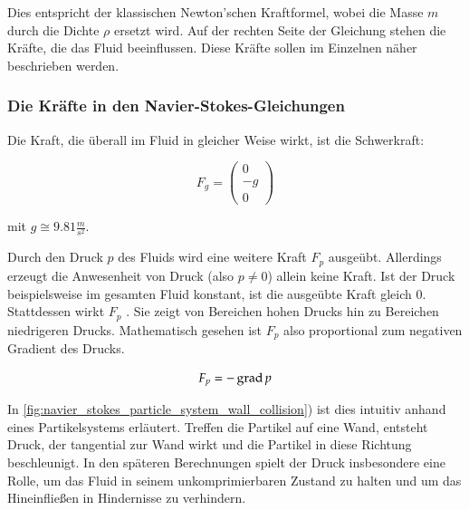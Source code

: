 Dies entspricht der klassischen Newton'schen Kraftformel, wobei die
Masse $m$ durch die Dichte $\rho$ ersetzt wird. Auf der rechten Seite
der Gleichung stehen die Kräfte, die das Fluid beeinflussen. Diese
Kräfte sollen im Einzelnen näher beschrieben werden.

\subsubsection{Die Kräfte in den Navier-Stokes-Gleichungen}

Die Kraft, die überall im Fluid in gleicher Weise wirkt, ist die Schwerkraft:

\begin{equation}
F_g =
\left(
\begin{array}{c}
0 \\
-g \\
0
\end{array}
\right)
\end{equation}

mit $g \cong 9.81 \frac{m}{s^2}$.

Durch den Druck $p$ des Fluids wird eine weitere Kraft $F_p$ ausgeübt.
Allerdings erzeugt die Anwesenheit von Druck (also $p \neq 0$) allein
keine Kraft. Ist der Druck beispielsweise im gesamten Fluid konstant,
ist die ausgeübte Kraft gleich 0. Stattdessen wirkt $F_p$
. Sie zeigt von Bereichen hohen Drucks hin
zu Bereichen niedrigeren Drucks. Mathematisch gesehen ist $F_p$ also
proportional zum negativen Gradient des Drucks.

\begin{equation}
\label{eq:navier_stokes_f_p}
F_p = -\operatorname*{grad} p
\end{equation}

 In \autoref{fig:navier_stokes_particle_system_wall_collision}) ist
dies intuitiv anhand eines Partikelsystems erläutert. Treffen die
Partikel auf eine Wand, entsteht Druck, der tangential zur Wand wirkt
und die Partikel in diese Richtung beschleunigt. In den späteren
Berechnungen spielt der Druck insbesondere eine Rolle, um das Fluid in
seinem unkomprimierbaren Zustand zu halten und um das Hineinfließen in
Hindernisse zu verhindern.

